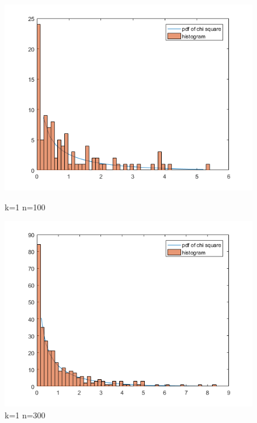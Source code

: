 \documentclass[10pt,a4paper]{report}
\begin{document}
\begin{figure}[h]
\begin{minipage}[b]{0.5\linewidth}
\centering
\includegraphics[width=\textwidth]{k1n100.png}
\caption{k=1 n=100}
\end{minipage}
\hspace{0.5cm}
\begin{minipage}[b]{0.5\linewidth}
\centering
\includegraphics[width=\textwidth]{k1n300.png}
\caption{k=1 n=300}
\end{minipage}
\end{figure}
	
\end{document}
